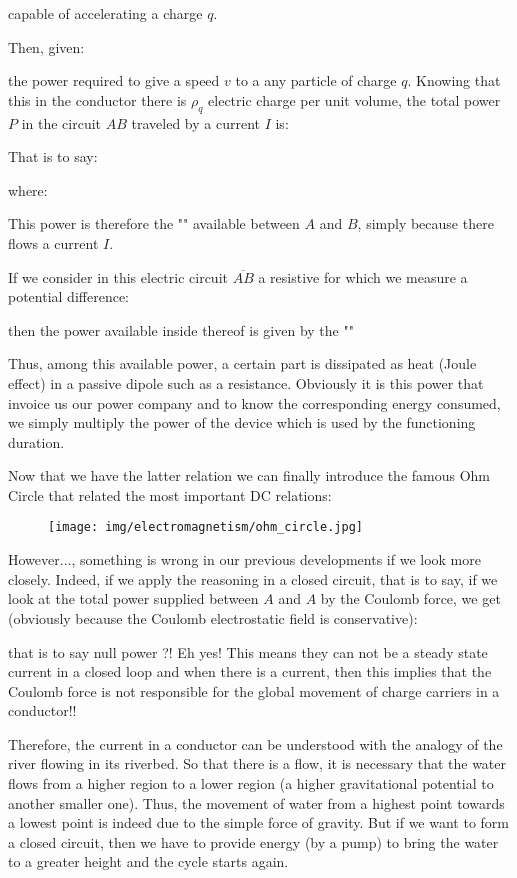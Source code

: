 	capable of accelerating a charge $q$.

	Then, given:
	
	the power required to give a speed $v$ to a any particle of charge $q$. Knowing that this in the conductor there is $\rho_q$ electric charge per unit volume, the total power $P$ in the circuit $AB$ traveled by a current $I$ is:
	
	That is to say:
	
	where:
	
	This power is therefore the "" available between $A$ and $B$, simply because there flows a current $I$.

	If we consider in this electric circuit $\overline{AB}$ a resistive for which we measure a potential difference:
	
	then the power available inside thereof is given by the ""
	
	Thus, among this available power, a certain part is dissipated as heat (Joule effect) in a passive dipole such as a resistance. Obviously it is this power that invoice us our power company and to know the corresponding energy consumed, we simply multiply the power of the device which is used by the functioning duration.
	
	Now that we have the latter relation we can finally introduce the famous Ohm Circle that related the most important DC relations:
	\begin{figure}[H]
		\centering
		\texttt{[image: img/electromagnetism/ohm\_circle.jpg]}
	\end{figure}
	However..., something is wrong in our previous developments if we look more closely. Indeed, if we apply the reasoning in a closed circuit, that is to say, if we look at the total power supplied between $A$ and $A$ by the Coulomb force, we get (obviously because the Coulomb electrostatic field is conservative):
	
	that is to say null power ?! Eh yes! This means they can not be a steady state current in a closed loop and when there is a current, then this implies that the Coulomb force is not responsible for the global movement of charge carriers in a conductor!!

	Therefore, the current in a conductor can be understood with the analogy of the river flowing in its riverbed. So that there is a flow, it is necessary that the water flows from a higher region to a lower region (a higher gravitational potential to another smaller one). Thus, the movement of water from a highest point towards a lowest point is indeed due to the simple force of gravity. But if we want to form a closed circuit, then we have to provide energy (by a pump) to bring the water to a greater height and the cycle starts again.
	
